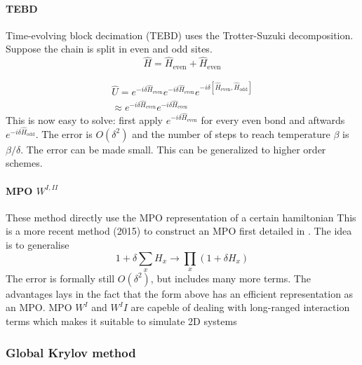 \paragraph{TEBD}\label{para:TEBD}
Time-evolving block decimation (TEBD)  uses the Trotter-Suzuki decomposition. Suppose the chain is split in even and odd sites.
\begin{equation}
    \hat{H} = \hat{H}_{\text{even}}+\hat{H}_{\text{even}}
\end{equation}

\begin{equation}\label{trotter_exp}
    \begin{split}
        \hat{U} = e^{-i \delta \hat{H}_{\text{even}}}  e^{-i \delta \hat{H}_{\text{even}} }e^{-i \delta \left[ \hat{H}_{\text{even}}, \hat{H}_{\text{odd}} \right] }\\
        \approx e^{-i \delta \hat{H}_{\text{even}}}  e^{-i \delta \hat{H}_{\text{even}} }
    \end{split}
\end{equation}
This is now easy to solve: first apply $e^{-i \delta \hat{H}_{\text{even}}}$ for every even bond and aftwards  $e^{-i \delta \hat{H}_{\text{odd}}}$. The error is $O(\delta^2)$ and the number of steps to reach temperature $\beta$ is $\beta / \delta$. The error can be made small. This can be generalized to higher order schemes.

\paragraph{ MPO $W^{I,II}$}
These method directly use the MPO representation of a certain hamiltonian
This is a more recent method (2015) to construct an MPO first detailed in \cite{Zaletel2015}. The idea is to generalise
\begin{equation}
    1+ \delta \sum_x H_x \rightarrow \prod_x (1+  \delta H_x)
\end{equation}
The error is formally still $O(\delta^2)$, but includes many more terms. The advantages lays in the fact that the form above has an efficient representation as an MPO. MPO $W^I$ and $W^II$ are capeble of dealing with long-ranged interaction terms which makes it suitable to simulate 2D systems \cite{Paeckel2019}

\subsubsection{Global Krylov method }

